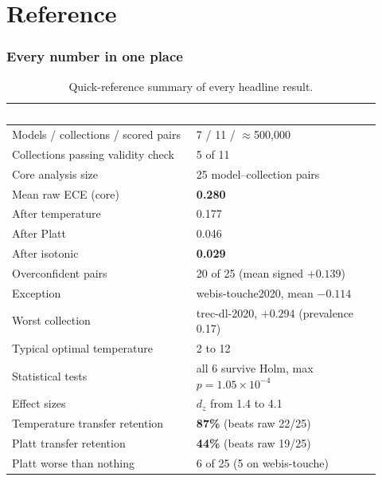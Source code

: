 \documentclass[11pt,a4paper]{article}
\newcommand{\thead}[1]{\textcolor{white}{\textbf{#1}}}
\begin{document}
\part{Reference}
\section{Every number in one place}\label{sec:allnumbers}

\begin{table}[h]
\centering
\caption{Quick-reference summary of every headline result.}\label{tab:allnumbers}
\small
\begin{tabular}{p{0.46\linewidth}p{0.46\linewidth}}
\toprule
\rowcolor{headblue}
\thead{Quantity} & \thead{Value} \\
\midrule
\rowcolor{rowlight}
Models / collections / scored pairs & 7 / 11 / $\approx$500{,}000 \\
Collections passing validity check & 5 of 11 \\
\rowcolor{rowlight}
Core analysis size & 25 model--collection pairs \\
\midrule
\rowcolor{rowlight}
Mean raw ECE (core) & \textbf{0.280} \\
After temperature & 0.177 \\
\rowcolor{rowlight}
After Platt & 0.046 \\
After isotonic & \textbf{0.029} \\
\midrule
\rowcolor{rowlight}
Overconfident pairs & 20 of 25 (mean signed $+0.139$) \\
Exception & webis-touche2020, mean $-0.114$ \\
\rowcolor{rowlight}
Worst collection & trec-dl-2020, $+0.294$ (prevalence 0.17) \\
Typical optimal temperature & 2 to 12 \\
\midrule
\rowcolor{rowlight}
Statistical tests & all 6 survive Holm, max $p = 1.05\times10^{-4}$ \\
Effect sizes & $d_z$ from 1.4 to 4.1 \\
\midrule
\rowcolor{rowlight}
Temperature transfer retention & \textbf{87\%} (beats raw 22/25) \\
Platt transfer retention & \textbf{44\%} (beats raw 19/25) \\
\rowcolor{rowlight}
Platt worse than nothing & 6 of 25 (5 on webis-touche) \\

\end{tabular}
\end{table}
\end{document}
